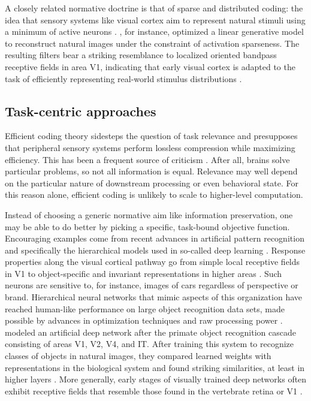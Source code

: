 A closely related normative doctrine is that of sparse and distributed coding: the idea that sensory systems like visual cortex aim to represent natural stimuli using a minimum of active neurons \citep{Simoncelli:2001dn}. \citet{Ohlshausen:1996aa}, for instance, optimized a linear generative model to reconstruct natural images under the constraint of activation sparseness. The resulting filters bear a striking resemblance to localized oriented bandpass receptive fields in area V1, indicating that early visual cortex is adapted to the task of efficiently representing real-world stimulus distributions \citep[for a related method based on independent component analysis, see][]{vanHateren:1998jt,Bell:1997ve}.

\subsection{Task-centric approaches}
Efficient coding theory sidesteps the question of task relevance and presupposes that peripheral sensory systems perform lossless compression while maximizing efficiency. This has been a frequent source of criticism \citep{Simoncelli:2003aa}. After all, brains solve particular problems, so not all information is equal. Relevance may well depend on the particular nature of downstream processing or even behavioral state. For this reason alone, efficient coding is unlikely to scale to higher-level computation.

Instead of choosing a generic normative aim like information preservation, one may be able to do better by picking a specific, task-bound objective function. Encouraging examples come from recent advances in artificial pattern recognition \citep{Bishop:2006aa} and specifically the hierarchical models used in so-called deep learning \citep{Goodfellow:2016aa}. Response properties along the visual cortical pathway go from simple local receptive fields in V1 to object-specific and invariant representations in higher areas \citep{Felleman:1991aa,Yamins:2016hg}. Such neurons are sensitive to, for instance, images of cars regardless of perspective or brand. Hierarchical neural networks that mimic aspects of this organization \citep{Fukushima:1980ve} have reached human-like performance on large object recognition data sets, made possible by advances in optimization techniques \citep{LeCun:1989aa} and raw processing power \citep{LeCun:2015dt}. \citet{Yamins:2014gi} modeled an artificial deep network after the primate object recognition cascade consisting of areas V1, V2, V4, and IT. After training this system to recognize classes of objects in natural images, they compared learned weights with representations in the biological system and found striking similarities, at least in higher layers \citep{Cadieu:2014in}. More generally, early stages of visually trained deep networks often exhibit receptive fields that resemble those found in the vertebrate retina or V1 \citep{Yamins:2016hg}.

